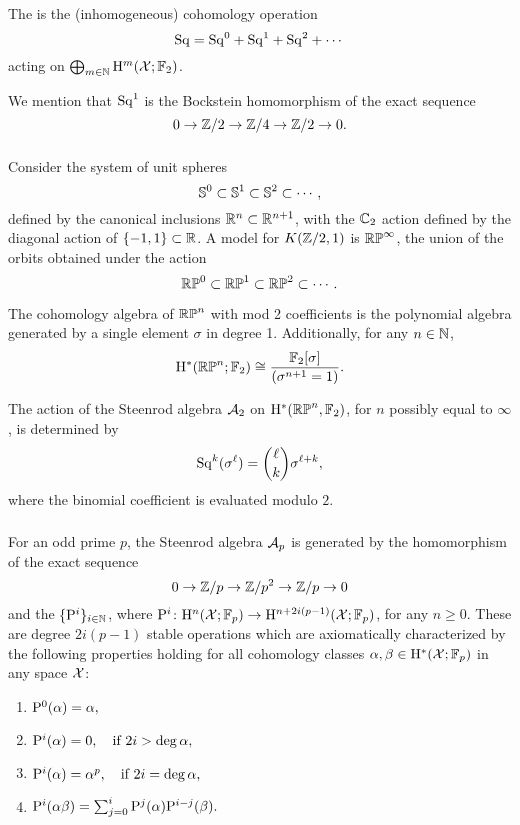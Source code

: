 The  is the (inhomogeneous) cohomology operation
\[
\mathrm{Sq} = \mathrm{Sq}^0 + \mathrm{Sq}^1 + \mathrm{Sq}^2 + \dotsb
\]
acting on \(\bigoplus_{m \in \mathbb{N}} \mathrm{H}^m(\mathcal{X}; {\mathbb{F}_2})\).

We mention that $\mathrm{Sq}^1$ is the Bockstein homomorphism of the exact sequence
\[
0 \to \mathbb{Z}/2 \to \mathbb{Z}/4 \to \mathbb{Z}/2 \to 0.
\]

\subsubsection{}\label{sss:cohomology_rpn}

Consider the system of unit spheres
\[
\mathbb{S}^0 \subset \mathbb{S}^1 \subset \mathbb{S}^2 \subset \dotsb,
\]
defined by the canonical inclusions \(\mathbb{R}^n \subset \mathbb{R}^{n+1}\), with the \(\mathbb{C}_2\) action defined by the diagonal action of \(\{-1,1\} \subset \mathbb{R}\).
A model for \(K(\mathbb{Z}/2, 1)\) is \(\mathbb{RP}^\infty\), the union of the orbits obtained under the action
\[
\mathbb{RP}^0 \subset \mathbb{RP}^1 \subset \mathbb{RP}^2 \subset \dotsb.
\]

The cohomology algebra of $\mathbb{RP}^n$ with mod 2 coefficients is the polynomial algebra generated by a single element $\sigma$ in degree 1.
Additionally, for any $n \in \mathbb{N}$,
\[
\mathrm{H}^\ast(\mathbb{RP}^n; {\mathbb{F}_2}) \cong \frac{{\mathbb{F}_2}[\sigma]}{(\sigma^{n+1} = 1)}.
\]

The action of the Steenrod algebra $\mathcal{A}_2$ on $\mathrm{H}^*(\mathbb{RP}^n, {\mathbb{F}_2})$, for $n$ possibly equal to $\infty$, is determined by
\[
\mathrm{Sq}^k(\sigma^\ell) = \binom{\ell}{k}\sigma^{\ell+k},
\]
where the binomial coefficient is evaluated modulo \(2\).

\subsubsection{}\label{sss:steenrod_odd}

For an odd prime \(p\), the Steenrod algebra $\mathcal{A}_p$ is generated by the  homomorphism of the exact sequence
\[
0 \to \mathbb{Z}/p \to \mathbb{Z}/p^2 \to \mathbb{Z}/p \to 0
\]
and the  \(\{\mathrm{P}^i\}_{i \in \mathbb{N}}\), where $\mathrm{P}^i \colon \mathrm{H}^n(\mathcal{X}; {\mathbb{F}_p}) \to \mathrm{H}^{n+2i(p-1)}(\mathcal{X}; {\mathbb{F}_p})$, for any $n\geq 0$.
These are degree \(2i(p-1)\) stable operations which are axiomatically characterized by the following properties holding for all cohomology classes \(\alpha, \beta \in \mathrm{H}^*(\mathcal{X}; {\mathbb{F}_p})\) in any space \(\mathcal{X}\):

\begin{enumerate}
	\item \(\mathrm{P}^0(\alpha) = \alpha,\)
	\item \(\mathrm{P}^i(\alpha) = 0, \quad \text{if } 2i > \deg\alpha,\)
	\item \(\mathrm{P}^i(\alpha) = \alpha^p, \quad \text{if } 2i = \deg\alpha,\)
	\item \(\mathrm{P}^i(\alpha \beta) = \textstyle\sum_{j=0}^{i} \mathrm{P}^j(\alpha) \mathrm{P}^{i-j}(\beta).\)
\end{enumerate}

